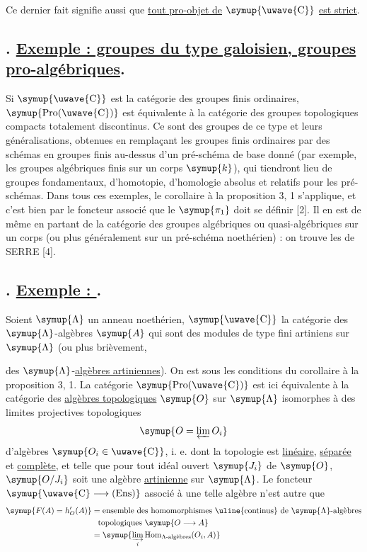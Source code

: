 Ce dernier fait signifie aussi que \uline{tout pro-objet de} $\symup{\text{\uwave{C}}}$ \uline{est strict}.

\subsection*{. \uline{Exemple : groupes du type galoisien, groupes pro-algébriques}.}

Si $\symup{\text{\uwave{C}}}$ est la catégorie des groupes finis ordinaires,
$\symup{\operatorname{Pro}(\text{\uwave{C}})}$ est équivalente à la catégorie des groupes
topologiques compacts totalement discontinus. Ce sont des groupes de ce type
et leurs généralisations, obtenues en remplaçant les groupes finis ordinaires
par des schémas en groupes finis au-dessus d'un pré-schéma de base donné (par
exemple, les groupes algébriques finis sur un corps $\symup{k}$), qui tiendront lieu de
groupes fondamentaux, d'homotopie, d'homologie absolus et relatifs pour les
pré-schémas. Dans tous ces exemples, le corollaire à la proposition 3, 1
s'applique, et c'est bien par le foncteur associé que le $\symup{\pi_1}$ doit se
définir [2]. Il en est de même en partant de la catégorie des groupes
algébriques ou quasi-algébriques sur un corps (ou plus généralement sur un
pré-schéma noethérien) : on trouve les  de SERRE [4].

\subsection*{. \uline{Exemple : }.}

Soient $\symup{\Lambda}$ un anneau noethérien, $\symup{\text{\uwave{C}}}$ la catégorie des
$\symup{\Lambda}$-algèbres $\symup{A}$ qui sont des modules de type fini artiniens sur
$\symup{\Lambda}$ (ou plus brièvement,

des $\symup{\Lambda}$-\uline{algèbres artiniennes}). On est sous les conditions du corollaire
à la proposition 3, 1. La catégorie $\symup{\operatorname{Pro}(\text{\uwave{C}})}$ est ici
équivalente à la catégorie des \uline{algèbres topologiques} $\symup{O}$ sur $\symup{\Lambda}$
isomorphes à des limites projectives topologiques
\[
  \symup{O=\varprojlim O_i}
\]
d'algèbres $\symup{O_i\in\text{\uwave{C}}}$, i. e. dont la topologie est \uline{linéaire}, \uline{séparée} et \uline{complète}, et telle que pour tout idéal ouvert $\symup{J_i}$ de $\symup{O}$, $\symup{O/J_i}$ soit une
algèbre \uline{artinienne} sur $\symup{\Lambda}$. Le foncteur
$\symup{\text{\uwave{C}}\longrightarrow(\operatorname{Ens})}$ associé à une telle algèbre
n'est autre que
\begin{align*}
  \symup{F(A)=h'_O(A)}
  &=\text{ensemble des homomorphismes \uline{continus} de }\symup{\Lambda}\text{-algèbres}\\
  &\phantom{=}\text{topologiques }\symup{O\longrightarrow A}\\
  &=\symup{\varinjlim\limits_i\operatorname{Hom}_{\Lambda\text{-algèbres}}(O_i,A)}
\end{align*}


